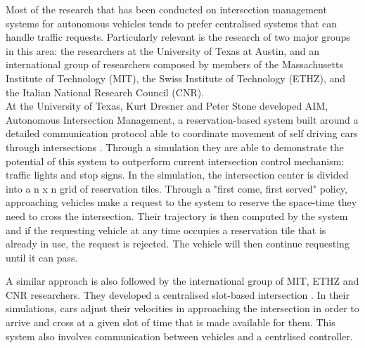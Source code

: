 Most of the research that has been conducted on intersection management systems for autonomous vehicles tends to prefer centralised systems that can handle traffic requests.
Particularly relevant is the research of two major groups in this area: the researchers at the University of Texas at Austin, and an international group of researchers composed by members of the Massachusetts Institute of Technology (MIT), the Swiss Institute of Technology (ETHZ), and the Italian National Research Council (CNR).\\

At the University of Texas, Kurt Dresner and Peter Stone developed AIM, Autonomous Intersection Management, a reservation-based system built around a detailed communication protocol able to coordinate movement of self driving cars through intersections \cite{texas}.
Through a simulation they are able to demonstrate the potential of this system to outperform current intersection control mechanism: traffic lights and stop signs.
In the simulation, the intersection center is divided into a n x n grid of reservation tiles.
Through a "first come, first served" policy, approaching vehicles make a request to the system to reserve the space-time they need to cross the intersection. 
Their trajectory is then computed by the system and if the requesting vehicle at any time occupies a reservation tile that is already in use, the request is rejected.
The vehicle will then continue requesting until it can pass.

A similar approach is also followed by the international group of MIT, ETHZ and CNR researchers.
They developed a centralised slot-based intersection \cite{mit}.
In their simulations, cars adjust their velocities in approaching the intersection in order to arrive and cross at a given slot of time that is made available for them.
This system also involves communication between vehicles and a centrlised controller.